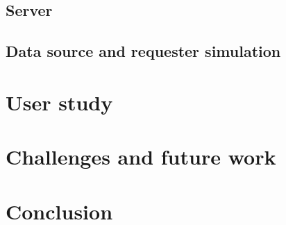 \documentclass[conference]{IEEEtran}
\begin{document}
\subsection{Server}

\subsection{Data source and requester simulation}


\section{User study}


\section{Challenges and future work}


\section{Conclusion}


\begin{thebibliography}{00}

\end{thebibliography}
\end{document}
